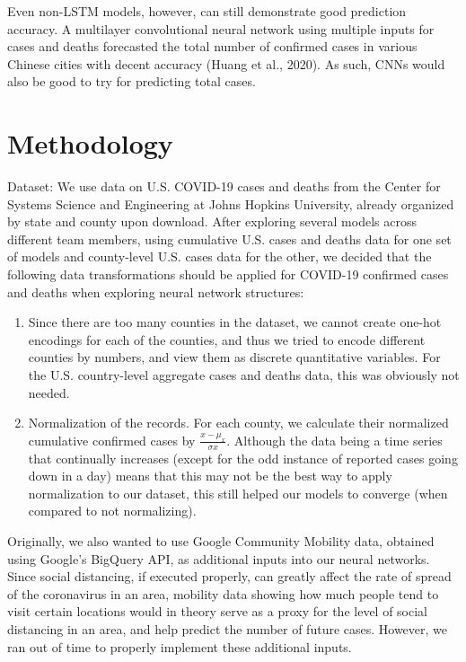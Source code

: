 ﻿\documentclass{article}
\begin{document}
\begin{multicols}{2}
Even non-LSTM models, however, can still demonstrate good prediction accuracy. A
multilayer convolutional neural network using multiple inputs for cases and
deaths forecasted the total number of confirmed cases in various Chinese cities
with decent accuracy (Huang et al., 2020). As such, CNNs would also be good to
try for predicting total cases.\\


\section*{Methodology}

Dataset: We use data on U.S. COVID-19 cases and deaths from the Center for
Systems Science and Engineering at Johns Hopkins University, already organized
by state and county upon download. After exploring several models across
different team members, using cumulative U.S. cases and deaths data for one
set of models and county-level U.S. cases data for the other, we decided that
the following data transformations should be applied for COVID-19 confirmed
cases and deaths when exploring neural network structures:

\begin{enumerate}
  
    \item Since there are too many counties in the dataset, we cannot create
      one-hot encodings for each of the counties, and thus we tried to encode
      different counties by numbers, and view them as discrete quantitative variables.
      For the U.S. country-level aggregate cases and deaths data, this was obviously
      not needed.

      \item Normalization of the records. For each county, we calculate their
        normalized cumulative confirmed cases by $\frac{x-\mu_{x}}{\sigma{x}}$. Although
        the data being a time series that continually increases (except for the odd
        instance of reported cases going down in a day) means that this may not be the
        best way to apply normalization to our dataset, this still helped our models to
        converge (when compared to not normalizing).

\end{enumerate}

Originally, we also wanted to use Google Community Mobility data, obtained using
Google’s BigQuery API, as additional inputs into our neural networks. Since
social distancing, if executed properly, can greatly affect the rate of spread
of the coronavirus in an area, mobility data showing how much people tend to
visit certain locations would in theory serve as a proxy for the level of social
distancing in an area, and help predict the number of future cases. However, we
ran out of time to properly implement these additional inputs.


\end{multicols}
\end{document}

